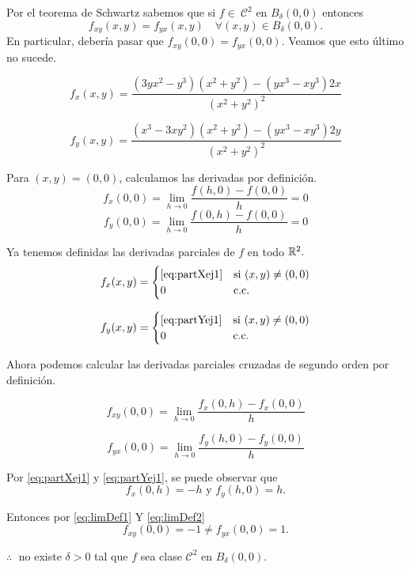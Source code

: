 \begin{solution}
    Por el teorema de Schwartz sabemos que si $f \in\ \mathcal{C}^2$ en  $B_{\delta}(0,0)$
    entonces $$  f_{xy} (x,y) = f_{yx} (x,y) \quad \forall (x,y) \in B_{\delta}(0,0).$$ En particular, deber\'ia pasar que $f_{xy} (0,0) = f_{yx}(0,0).$ Veamos que esto \'ultimo no sucede.

    \begin{equation}
        f_x(x,y) = \frac{(3yx^2-y^3)(x^2+y^2) - (yx^3-xy^3)2x}{(x^2+y^2)^2} \label{eq:partXej1}
    \end{equation}

    \begin{equation}
        f_y(x,y) = \frac{(x^3-3xy^2)(x^2+y^2) - (yx^3-xy^3)2y}{(x^2+y^2)^2}  \label{eq:partYej1}
    \end{equation}

    Para $(x,y) = (0,0)$, calculamos las derivadas por definición.
    \[
        f_x(0,0)  = \lim_{h\to0} \frac{f(h,0) - f(0,0)}{h} = 0
    \]
    \[
        f_y(0,0)  =  \lim_{h\to0} \frac{f(0,h) - f(0,0)}{h} = 0
    \]

    Ya tenemos definidas las derivadas parciales de $f$ en todo $\mathbb{R}^2.$
    \[
        f_x(x,y) =
        \begin{cases}
            \eqref{eq:partXej1} & \text{si}\ (x,y) \neq (0,0) \\
            0                   & \text{c.c.}
        \end{cases}
    \]

    \[
        f_y(x,y) =
        \begin{cases}
            \eqref{eq:partYej1} & \text{si}\ (x,y) \neq (0,0) \\
            0                   & \text{c.c.}
        \end{cases}
    \]

    Ahora podemos calcular las derivadas parciales cruzadas de segundo orden por definición.

    \begin{equation}
        f_{xy}(0,0) = \lim_{h\to0} \frac{f_x(0,h) - f_x(0,0)}{h} \label{eq:limDef1}
    \end{equation}

    \begin{equation}
        f_{yx}(0,0) = \lim_{h\to0} \frac{f_y(h,0) - f_y(0,0)}{h}  \label{eq:limDef2}
    \end{equation}

    Por \eqref{eq:partXej1} y \eqref{eq:partYej1}, se puede observar que
    \[
        f_x(0,h) = -h \text{ y } f_y(h,0) = h.
    \]

    Entonces por \eqref{eq:limDef1} Y \eqref{eq:limDef2}
    \[
        f_{xy}(0,0) = -1 \neq f_{yx}(0,0) = 1.
    \]

    $\therefore\;$ no existe $\delta>0$ tal que $f$ sea clase $\mathcal{C}^2$ en $B_{\delta}(0,0)$.
\end{solution}

